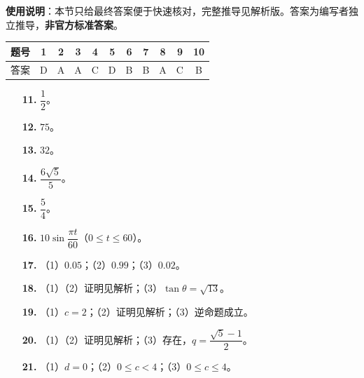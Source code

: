 
\begin{gknotice}
\textbf{使用说明}：本节只给最终答案便于快速核对，完整推导见解析版。答案为编写者独立推导，\textbf{非官方标准答案}。
\end{gknotice}

\begin{center}\begin{tabular}{ccccccccccc}
\toprule
题号 & 1 & 2 & 3 & 4 & 5 & 6 & 7 & 8 & 9 & 10 \\
\midrule
答案 & D & A & A & C & D & B & B & A & C & B \\
\bottomrule
\end{tabular}\end{center}

\begin{itemize}[leftmargin=2.6em]
  \item[\textbf{11.}] $\dfrac12$。
  \item[\textbf{12.}] $75$。
  \item[\textbf{13.}] $32$。
  \item[\textbf{14.}] $\dfrac{6\sqrt5}{5}$。
  \item[\textbf{15.}] $\dfrac54$。
  \item[\textbf{16.}] $10\sin\dfrac{\pi t}{60}$（$0\leqslant t\leqslant60$）。
\end{itemize}

\begin{itemize}[leftmargin=2.6em]
  \item[\textbf{17.}] （1）$0.05$；（2）$0.99$；（3）$0.02$。
  \item[\textbf{18.}] （1）（2）证明见解析；（3）$\tan\theta=\sqrt{13}$。
  \item[\textbf{19.}] （1）$c=2$；（2）证明见解析；（3）逆命题成立。
  \item[\textbf{20.}] （1）（2）证明见解析；（3）存在，$q=\dfrac{\sqrt5-1}{2}$。
  \item[\textbf{21.}] （1）$d=0$；（2）$0\leqslant c<4$；（3）$0\leqslant c\leqslant4$。
\end{itemize}
